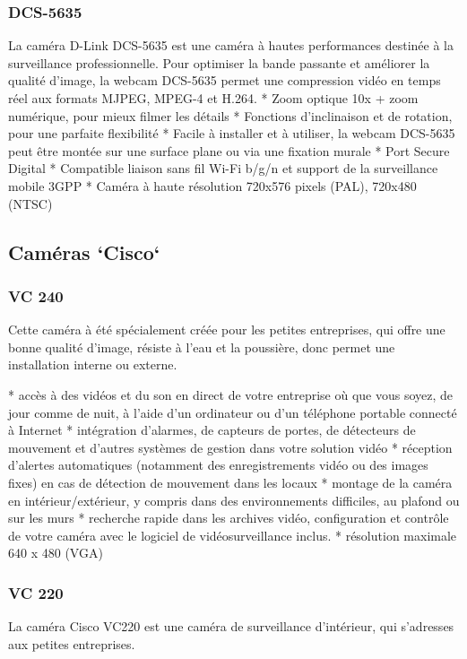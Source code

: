 	\subsubsection{DCS-5635}
La caméra D-Link DCS-5635 est une caméra à hautes performances destinée à la
surveillance professionnelle.
Pour optimiser la bande passante et améliorer la qualité d'image, la webcam
DCS-5635 permet une compression vidéo en temps réel aux formats MJPEG, MPEG-4 et
H.264.
    * Zoom optique 10x + zoom numérique, pour mieux filmer les détails
    * Fonctions d'inclinaison et de rotation, pour une parfaite flexibilité
    * Facile à installer et à utiliser, la webcam DCS-5635 peut être montée sur une surface plane ou via une fixation murale
    * Port Secure Digital
    * Compatible liaison sans fil Wi-Fi b/g/n et support de la surveillance mobile 3GPP
    * Caméra à haute résolution 720x576 pixels (PAL), 720x480 (NTSC)

\subsection{Caméras `Cisco`}
	\subsubsection{VC 240}
Cette caméra à été spécialement créée pour les petites entreprises, qui offre
une bonne qualité d'image, résiste à l'eau et la poussière, donc permet une
installation interne ou externe.

    * accès à des vidéos et du son en direct de votre entreprise où que vous
    soyez, de jour comme de nuit, à l'aide d'un ordinateur ou d'un téléphone
    portable connecté à Internet 
    * intégration d'alarmes, de capteurs de portes, de détecteurs de mouvement
    et d'autres systèmes de gestion dans votre solution vidéo 
    * réception d'alertes automatiques (notamment des enregistrements vidéo ou
    des images fixes) en cas de détection de mouvement dans les locaux
    * montage de la caméra en intérieur/extérieur, y compris dans des
    environnements difficiles, au plafond ou sur les murs
    * recherche rapide dans les archives vidéo, configuration et contrôle de
    votre caméra avec le logiciel de vidéosurveillance inclus.
	* résolution maximale 640 x 480 (VGA)
	
	\subsubsection{VC 220}
La caméra Cisco VC220 est une caméra de surveillance d'intérieur, qui s'adresses
aux petites entreprises.

